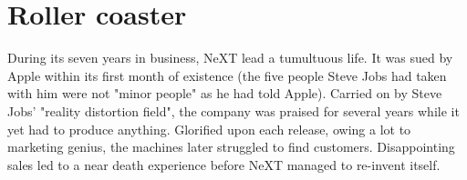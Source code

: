\section{Roller coaster}
During its seven years in business, NeXT lead a tumultuous life. It was sued by Apple within its first month of existence (the five people Steve Jobs had taken with him were not "minor people" as he had told Apple). Carried on by Steve Jobs' "reality distortion field", the company was praised for several years while it yet had to produce anything. Glorified upon each release, owing a lot to marketing genius, the machines later struggled to find customers. Disappointing sales led to a near death experience before NeXT managed to re-invent itself.\\
\par
\vspace{-5pt}
